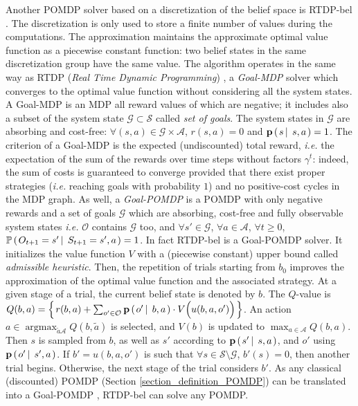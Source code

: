 Another POMDP solver based on a discretization of the belief space is RTDP-bel \cite{Geffner98solvinglarge}.
The discretization is only used to store a finite number of values during the computations.
The approximation maintains the approximate optimal value function as a piecewise constant function:
two belief states in the same discretization group have the same value.
The algorithm operates in the same way as RTDP (\textit{Real Time Dynamic Programming}) \cite{Barto93learningto},
a \textit{Goal-MDP} solver which converges to the optimal value function without considering all the system states.
A Goal-MDP \cite{Bertsekas:2000:DPO:517430} is an MDP 
all reward values of which are negative;
it includes also a subset of the system state 
$\mathcal{G} \subset \mathcal{S}$
called \textit{set of goals}. 
The system states in $\mathcal{G}$ are absorbing and cost-free: 
$\forall (s,a) \in \mathcal{G} \times \mathcal{A}$,
$r(s,a)=0$ and $\textbf{p} \left( \left. s \, \right| \left. \, s,a \right. \right) = 1$.
The criterion of a Goal-MDP is the expected (undiscounted) total reward,
\textit{i.e.} the expectation of the sum of the rewards over time steps 
without factors $\gamma^t$: indeed, the sum of costs is guaranteed
to converge provided that there exist proper strategies
(\textit{i.e.} reaching goals with probability $1$)
and no positive-cost cycles in the MDP graph.
As well, a \textit{Goal-POMDP} is a POMDP with only negative rewards
and a set of goals $\mathcal{G}$ which are  absorbing, cost-free and fully observable system states \textit{i.e.}
$\mathcal{O}$ contains $\mathcal{G}$ too, 
and $\forall s' \in \mathcal{G}$, $\forall a \in \mathcal{A}$, $\forall t \geqslant 0$,
$\mathbb{P} \left( \left.  O_{t+1} = s' \, \right| \left. \, S_{t+1} = s', a   \right. \right) = 1$.
In fact RTDP-bel is a Goal-POMDP solver.
It initializes the value function $V$ with a (piecewise constant) upper bound called \textit{admissible heuristic}.
Then, the repetition of trials starting from $b_0$ improves the approximation of the optimal value function and the associated strategy.
At a given stage of a trial, the current belief state is denoted by $b$. 
The $Q$-value is $Q(b,a) = \left\{ \left.  r(b,a) + \sum_{o' \in \mathcal{O}} \textbf{p} \left( \left.  o' \, \right| \left. \, b, a   \right. \right) \cdot V \Big( u(b,a,o') \Big)  \right. \right\}$.
An action $a \in \operatorname*{argmax}_{\tilde{a} \mathcal{A}} Q(b,\tilde{a})$
is selected, and $V(b)$ is updated to $\max_{a \in \mathcal{A}} Q(b,a)$.
Then $s$ is sampled from $b$, as well as $s'$ according to $\textbf{p} \left( \left.  s' \, \right| \left. \, s,a  \right. \right)$, 
and $o'$ using $\textbf{p} \left( \left.  o' \, \right| \left. \, s',a  \right. \right)$.
If $b'=u(b,a,o')$ is such that $\forall s \in \mathcal{S}\setminus\mathcal{G}$, 
$b'(s)=0$, then another trial begins. Otherwise, the next stage of the trial considers $b'$.
As any classical (discounted) POMDP (Section \ref{section_definition_POMDP})
can be translated into a Goal-POMDP \cite{DBLP:conf/ijcai/BonetG09},
RTDP-bel can solve any POMDP.

